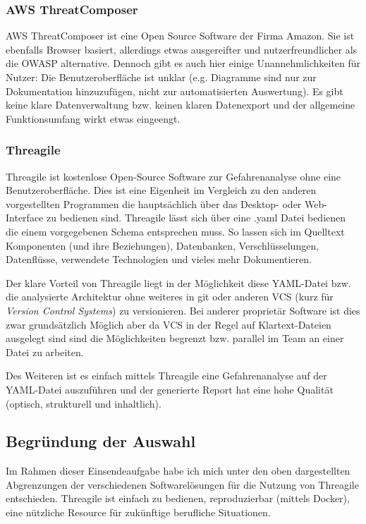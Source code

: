 \documentclass{article}
\begin{document}
\subsubsection*{AWS ThreatComposer}

AWS ThreatComposer ist eine Open Source Software der Firma Amazon. Sie ist ebenfalls 
Browser basiert, allerdings etwas ausgereifter und nutzerfreundlicher als die OWASP 
alternative. Dennoch gibt es auch hier einige Unannehmlichkeiten für Nutzer: Die 
Benutzeroberfläche ist unklar (e.g. Diagramme sind nur zur Dokumentation hinzuzufügen, 
nicht zur automatisierten Auswertung). Es gibt keine klare Datenverwaltung bzw. keinen 
klaren Datenexport und der allgemeine Funktionsumfang wirkt etwas eingeengt.

\subsubsection*{Threagile}

Threagile ist kostenlose Open-Source Software zur Gefahrenanalyse ohne eine 
Benutzeroberfläche. Dies ist eine Eigenheit im Vergleich zu den anderen vorgestellten 
Programmen die hauptsächlich über das Desktop- oder Web-Interface zu bedienen sind.
Threagile lässt sich über eine .yaml Datei bedienen die einem vorgegebenen Schema 
entsprechen muss. So lassen sich im Quelltext Komponenten (und ihre Beziehungen), 
Datenbanken, Verschlüsselungen, Datenflüsse, verwendete Technologien und vieles mehr 
Dokumentieren.

Der klare Vorteil von Threagile liegt in der Möglichkeit diese YAML-Datei bzw. die 
analysierte Architektur ohne weiteres in git oder anderen VCS (kurz für \textit{Version 
Control Systems}) zu versionieren. Bei anderer proprietär Software ist dies zwar 
grundsätzlich Möglich aber da VCS in der Regel auf Klartext-Dateien ausgelegt sind sind 
die Möglichkeiten begrenzt bzw. parallel im Team an einer Datei zu arbeiten.

Des Weiteren ist es einfach mittels Threagile eine Gefahrenanalyse auf der YAML-Datei 
auszuführen und der generierte Report hat eine hohe Qualität (optisch, strukturell und 
inhaltlich).

\subsection{Begründung der Auswahl}

Im Rahmen dieser Einsendeaufgabe habe ich mich unter den oben dargestellten Abgrenzungen 
der verschiedenen Softwarelösungen für die Nutzung von Threagile entschieden. Threagile 
ist einfach zu bedienen, reproduzierbar (mittels Docker), eine nützliche Resource für 
zukünftige berufliche Situationen.
\end{document}
